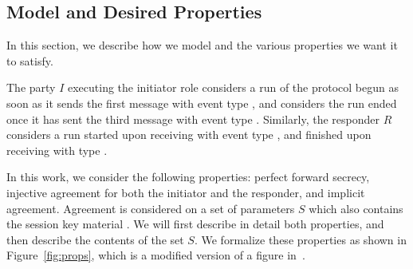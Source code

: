 \subsection{Model and Desired Properties}
\label{sec:desired-properties}
In this section, we describe how we model \mEdhoc{} and the various properties we want it to satisfy.
%

The party $I$ executing the initiator role considers a run of the protocol begun as soon as it sends the first message \mMsgone{} with event type \mIStart, and considers the run ended once it has sent the third message \mMsgthree{} with event type \mIComplete.
%
Similarly, the responder $R$ considers a run started upon receiving \mMsgone{} with event type \mRStart, and finished upon receiving \mMsgthree{} with type \mRComplete.
%

%
In this work, we consider the following properties: perfect forward secrecy, injective agreement for both the initiator and the responder, and implicit agreement. 
%
Agreement is considered on a set of parameters $S$ which also contains the session key material \mSessKey{}.
%
We will first describe in detail both properties, and then describe the contents of the set $S$.
%
We formalize these properties as shown in Figure~\ref{fig:props}, which is a modified version of a figure in~\cite{Norr21}.

